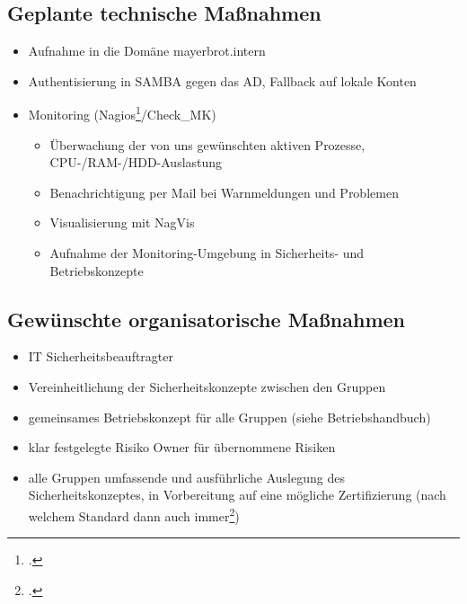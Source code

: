 \subsection{Geplante technische Maßnahmen}
\begin{itemize}
\item Aufnahme in die Domäne mayerbrot.intern
\item Authentisierung in SAMBA gegen das AD, Fallback auf lokale Konten
\item Monitoring (Nagios\footcite{nagios}/Check\_MK)
\begin{itemize}
	\item Überwachung der von uns gewünschten aktiven Prozesse, CPU-/RAM-/HDD-Auslastung
	\item Benachrichtigung per Mail bei Warnmeldungen und Problemen
	\item Visualisierung mit NagVis
	\item Aufnahme der Monitoring-Umgebung in Sicherheits- und Betriebskonzepte
\end{itemize}
\end{itemize}

\subsection{Gewünschte organisatorische Maßnahmen}
\begin{itemize}
\item IT Sicherheitsbeauftragter
\item Vereinheitlichung der Sicherheitskonzepte zwischen den Gruppen
\item gemeinsames Betriebskonzept für alle Gruppen (siehe Betriebshandbuch)
\item klar festgelegte Risiko Owner für übernommene Risiken
\item alle Gruppen umfassende und ausführliche Auslegung des Sicherheitskonzeptes, in Vorbereitung auf eine mögliche Zertifizierung (nach welchem Standard dann auch immer\footcite{wikiCyberSecStandards})
\end{itemize}

